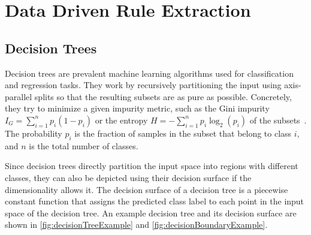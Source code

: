 \section{Data Driven Rule Extraction}

\subsection{Decision Trees}

Decision trees are prevalent machine learning algorithms used for classification and regression tasks. They work by recursively partitioning the input using axis-parallel splits so that the resulting subsets are as pure as possible. Concretely, they try to minimize a given impurity metric, such as the Gini impurity $I_G = \sum_{i=1}^{n} p_i(1-p_i)$ or the entropy $H = -\sum_{i=1}^{n} p_i \log_2(p_i)$ of the subsets~\cite{10.5555/2380985}. The probability $p_i$ is the fraction of samples in the subset that belong to class $i$, and $n$ is the total number of classes.

Since decision trees directly partition the input space into regions with different classes, they can also be depicted using their decision surface if the dimensionality allows it. The decision surface of a decision tree is a piecewise constant function that assigns the predicted class label to each point in the input space of the decision tree. An example decision tree and its decision surface are shown in \autoref{fig:decisionTreeExample} and \autoref{fig:decisionBoundaryExample}.

